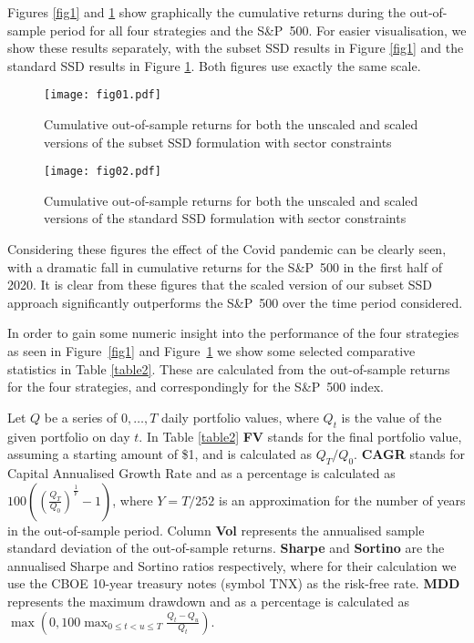 Figures \ref{fig1} and \ref{fig2} show graphically the cumulative returns during the out-of-sample period for all four strategies and the S\&P~500. For easier visualisation, we show these results separately, with
the subset SSD results in Figure \ref{fig1} and the standard SSD results in Figure \ref{fig2}. Both figures  use exactly the same scale. 


\begin{figure}[!htb]
\centering
\texttt{[image: fig01.pdf]}
  \caption{Cumulative  out-of-sample returns for both the unscaled and scaled versions of the subset SSD formulation with sector constraints}
  \label{fig1}
\vspace{1cm}
\texttt{[image: fig02.pdf]}
  \caption{Cumulative  out-of-sample returns for both the unscaled and scaled versions of the standard SSD formulation with sector constraints}
  \label{fig2}
\end{figure}


Considering these figures the effect of the Covid pandemic can be clearly seen, with a dramatic fall in cumulative returns for the S\&P~500 in
the first half of 2020. It is clear  from these figures
that the scaled version of our subset SSD approach significantly outperforms the S\&P~500 over the time period considered.

In order to gain some numeric insight into the performance of the four strategies as seen in Figure~\ref{fig1} and Figure~\ref{fig2} we show some selected comparative statistics
in Table \ref{table2}. These are calculated from the out-of-sample returns for the four strategies, and correspondingly for the S\&P~500 index. 

Let $Q$ be a series of $0,\ldots,T$ daily portfolio values, where $Q_t$ is the value of the given portfolio on day $t$. 
In Table \ref{table2} \textbf{FV} stands for the final portfolio value, assuming a starting amount of \$1, and is calculated as $Q_{T}/Q_{0}$. \textbf{CAGR} stands for Capital Annualised Growth Rate and as a percentage is calculated as $100  \left( \left(\frac{Q_T}{Q_0}\right)^{\frac{1}{Y}} -1 \right)$, where $Y = T/252$ is an approximation for the number of years in the out-of-sample period. Column \textbf{Vol} represents the annualised sample standard deviation of the out-of-sample returns. \textbf{Sharpe} and \textbf{Sortino} are the annualised Sharpe and Sortino ratios respectively, where for their calculation we use the CBOE 10-year treasury notes (symbol TNX) as the risk-free rate. \textbf{MDD} represents the maximum drawdown and as a percentage is calculated as $\max \left(0, 100 \max_{0 \leq t < u \leq T} \frac{Q_t - Q_u}{Q_t} \right)$. 

